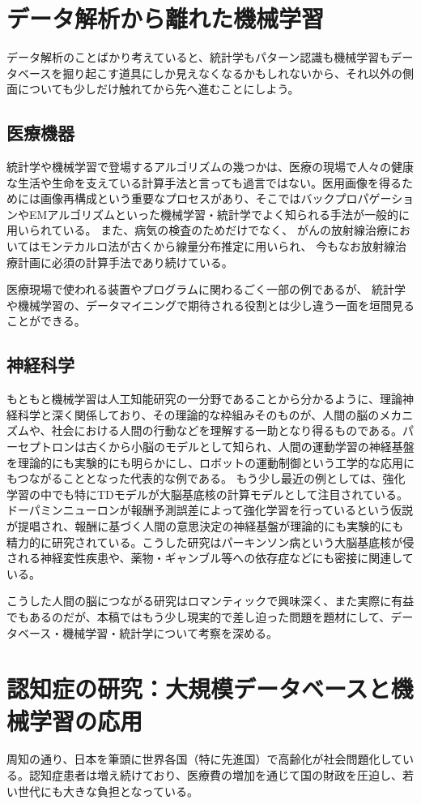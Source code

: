 \section{データ解析から離れた機械学習}
データ解析のことばかり考えていると、統計学もパターン認識も機械学習もデータベースを掘り起こす道具にしか見えなくなるかもしれないから、それ以外の側面についても少しだけ触れてから先へ進むことにしよう。
\subsection{医療機器}
統計学や機械学習で登場するアルゴリズムの幾つかは、医療の現場で人々の健康な生活や生命を支えている計算手法と言っても過言ではない。医用画像を得るためには画像再構成という重要なプロセスがあり、そこではバックプロパゲーションやEMアルゴリズムといった機械学習・統計学でよく知られる手法が一般的に用いられている。
また、病気の検査のためだけでなく、
がんの放射線治療においてはモンテカルロ法が古くから線量分布推定に用いられ、
今もなお放射線治療計画に必須の計算手法であり続けている。

医療現場で使われる装置やプログラムに関わるごく一部の例であるが、
統計学や機械学習の、データマイニングで期待される役割とは少し違う一面を垣間見ることができる。

\subsection{神経科学}
もともと機械学習は人工知能研究の一分野であることから分かるように、理論神経科学と深く関係しており、その理論的な枠組みそのものが、人間の脳のメカニズムや、社会における人間の行動などを理解する一助となり得るものである。パーセプトロンは古くから小脳のモデルとして知られ、人間の運動学習の神経基盤を理論的にも実験的にも明らかにし、ロボットの運動制御という工学的な応用にもつながることとなった代表的な例である。
もう少し最近の例としては、強化学習の中でも特にTDモデルが大脳基底核の計算モデルとして注目されている。ドーパミンニューロンが報酬予測誤差によって強化学習を行っているという仮説が提唱され、報酬に基づく人間の意思決定の神経基盤が理論的にも実験的にも精力的に研究されている。こうした研究はパーキンソン病という大脳基底核が侵される神経変性疾患や、薬物・ギャンブル等への依存症などにも密接に関連している。

こうした人間の脳につながる研究はロマンティックで興味深く、また実際に有益でもあるのだが、本稿ではもう少し現実的で差し迫った問題を題材にして、データベース・機械学習・統計学について考察を深める。

\section{認知症の研究：大規模データベースと機械学習の応用}
周知の通り、日本を筆頭に世界各国（特に先進国）で高齢化が社会問題化している。認知症患者は増え続けており、医療費の増加を通じて国の財政を圧迫し、若い世代にも大きな負担となっている。

